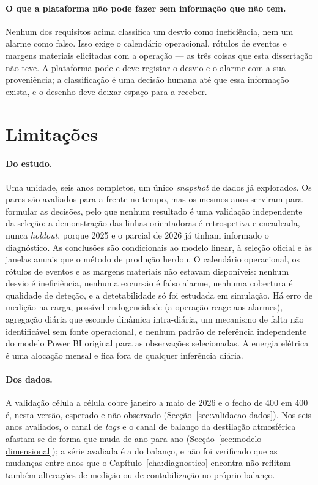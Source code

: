 \paragraph{O que a plataforma não pode fazer sem informação que não tem.}
Nenhum dos requisitos acima classifica um desvio como ineficiência, nem um
alarme como falso. Isso exige o calendário operacional, rótulos de eventos e
margens materiais elicitadas com a operação --- as três coisas que esta
dissertação não teve. A plataforma pode e deve registar o desvio e o alarme
com a sua proveniência; a classificação é uma decisão humana até que essa
informação exista, e o desenho deve deixar espaço para a receber.

\section{Limitações}
\label{sec:limitacoes}

\paragraph{Do estudo.} Uma unidade, seis anos completos, um único
\emph{snapshot} de dados já explorados. Os pares são avaliados para a frente
no tempo, mas os mesmos anos serviram para formular as decisões, pelo que
nenhum resultado é uma validação independente da seleção: a demonstração das
linhas orientadoras é retrospetiva e encadeada, nunca \emph{holdout}, porque
2025 e o parcial de 2026 já tinham informado o diagnóstico. As conclusões são
condicionais ao modelo linear, à seleção oficial e às janelas anuais que o
método de produção herdou. O calendário operacional, os rótulos de eventos e
as margens materiais não estavam disponíveis: nenhum desvio é ineficiência,
nenhuma excursão é falso alarme, nenhuma cobertura é qualidade de deteção,
e a detetabilidade só foi estudada em simulação. Há erro de medição na
carga, possível endogeneidade (a operação reage aos alarmes), agregação
diária que esconde dinâmica intra-diária, um mecanismo de falta não
identificável sem fonte operacional, e nenhum padrão de referência
independente do modelo Power BI original para as observações selecionadas.
A energia elétrica é uma alocação mensal e fica fora de qualquer inferência
diária.

\paragraph{Dos dados.} A validação célula a célula cobre janeiro a maio de
2026 e o fecho de 400 em 400 é, nesta versão, esperado e não observado
(Secção~\ref{sec:validacao-dados}). Nos seis anos avaliados, o canal de
\emph{tags} e o canal de balanço da destilação atmosférica afastam-se de
forma que muda de ano para ano (Secção~\ref{sec:modelo-dimensional}); a
série avaliada é a do balanço, e não foi verificado que as mudanças entre
anos que o Capítulo~\ref{cha:diagnostico} encontra não reflitam também
alterações de medição ou de contabilização no próprio balanço.

